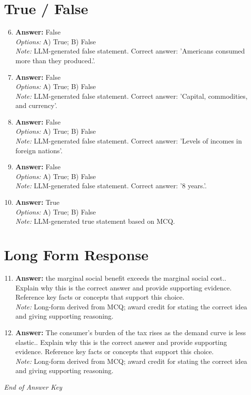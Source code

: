 \documentclass[12pt]{article}
\begin{document}
\section*{True / False}
\begin{enumerate}[label=\arabic*.]
\setcounter{enumi}{5}
\item \textbf{Answer:} False
\\ \textit{Options:} A) True; B) False
\\ \textit{Note:} LLM-generated false statement. Correct answer: 'Americans consumed more than they produced.'.
\item \textbf{Answer:} False
\\ \textit{Options:} A) True; B) False
\\ \textit{Note:} LLM-generated false statement. Correct answer: 'Capital, commodities, and currency'.
\item \textbf{Answer:} False
\\ \textit{Options:} A) True; B) False
\\ \textit{Note:} LLM-generated false statement. Correct answer: 'Levels of incomes in foreign nations'.
\item \textbf{Answer:} False
\\ \textit{Options:} A) True; B) False
\\ \textit{Note:} LLM-generated false statement. Correct answer: '8 years.'.
\item \textbf{Answer:} True
\\ \textit{Options:} A) True; B) False
\\ \textit{Note:} LLM-generated true statement based on MCQ.
\end{enumerate}

\section*{Long Form Response}
\begin{enumerate}[label=\arabic*.]
\setcounter{enumi}{10}
\item \textbf{Answer:} the marginal social benefit exceeds the marginal social cost.. Explain why this is the correct answer and provide supporting evidence. Reference key facts or concepts that support this choice.
\\ \textit{Note:} Long-form derived from MCQ; award credit for stating the correct idea and giving supporting reasoning.
\item \textbf{Answer:} The consumer's burden of the tax rises as the demand curve is less elastic.. Explain why this is the correct answer and provide supporting evidence. Reference key facts or concepts that support this choice.
\\ \textit{Note:} Long-form derived from MCQ; award credit for stating the correct idea and giving supporting reasoning.
\end{enumerate}

\vfill
\noindent\textit{End of Answer Key}
\end{document}
